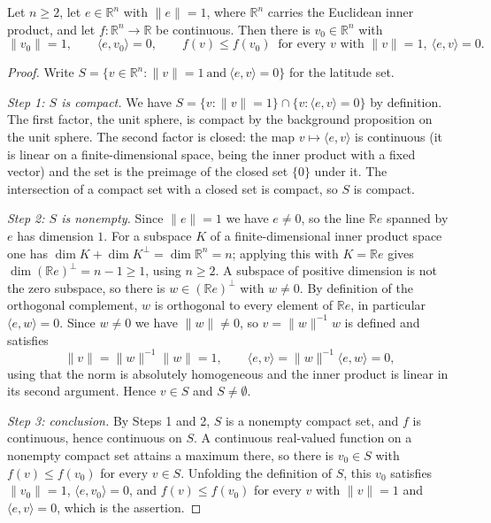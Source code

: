 \begin{lemma}
Let $n\ge2$, let $e\in\mathbb{R}^n$ with $\lVert e\rVert=1$, where
$\mathbb{R}^n$ carries the Euclidean inner product, and let
$f:\mathbb{R}^n\to\mathbb{R}$ be continuous. Then there is
$v_0\in\mathbb{R}^n$ with
\[
  \lVert v_0\rVert=1,
  \qquad
  \langle e,v_0\rangle=0,
  \qquad
  f(v)\le f(v_0)\ \text{ for every }v\text{ with }\lVert v\rVert=1,\ \langle e,v\rangle=0 .
\]
\end{lemma}
\begin{proof}
Write $S=\{v\in\mathbb{R}^n:\lVert v\rVert=1\ \text{and}\ \langle e,v\rangle=0\}$
for the latitude set.

\emph{Step 1: $S$ is compact.} We have
$S=\bigl\{v:\lVert v\rVert=1\bigr\}\cap\bigl\{v:\langle e,v\rangle=0\bigr\}$ by
definition. The first factor, the unit sphere, is compact by the background
proposition on the unit sphere. The second factor is closed: the map
$v\mapsto\langle e,v\rangle$ is continuous (it is linear on a
finite-dimensional space, being the inner product with a fixed vector) and the
set is the preimage of the closed set $\{0\}$ under it. The intersection of a
compact set with a closed set is compact, so $S$ is compact.

\emph{Step 2: $S$ is nonempty.} Since $\lVert e\rVert=1$ we have $e\ne0$, so the
line $\mathbb{R}e$ spanned by $e$ has dimension $1$. For a subspace $K$ of a
finite-dimensional inner product space one has
$\dim K+\dim K^{\perp}=\dim\mathbb{R}^n=n$; applying this with $K=\mathbb{R}e$
gives $\dim(\mathbb{R}e)^{\perp}=n-1\ge1$, using $n\ge2$. A subspace of positive
dimension is not the zero subspace, so there is $w\in(\mathbb{R}e)^{\perp}$ with
$w\ne0$. By definition of the orthogonal complement, $w$ is orthogonal to every
element of $\mathbb{R}e$, in particular $\langle e,w\rangle=0$. Since $w\ne0$ we
have $\lVert w\rVert\ne0$, so $v=\lVert w\rVert^{-1}w$ is defined and satisfies
\[
  \lVert v\rVert=\lVert w\rVert^{-1}\lVert w\rVert=1,
  \qquad
  \langle e,v\rangle=\lVert w\rVert^{-1}\langle e,w\rangle=0 ,
\]
using that the norm is absolutely homogeneous and the inner product is linear in
its second argument. Hence $v\in S$ and $S\ne\emptyset$.

\emph{Step 3: conclusion.} By Steps 1 and 2, $S$ is a nonempty compact set, and
$f$ is continuous, hence continuous on $S$. A continuous real-valued function on
a nonempty compact set attains a maximum there, so there is $v_0\in S$ with
$f(v)\le f(v_0)$ for every $v\in S$. Unfolding the definition of $S$, this
$v_0$ satisfies $\lVert v_0\rVert=1$, $\langle e,v_0\rangle=0$, and
$f(v)\le f(v_0)$ for every $v$ with $\lVert v\rVert=1$ and
$\langle e,v\rangle=0$, which is the assertion.
\end{proof}
